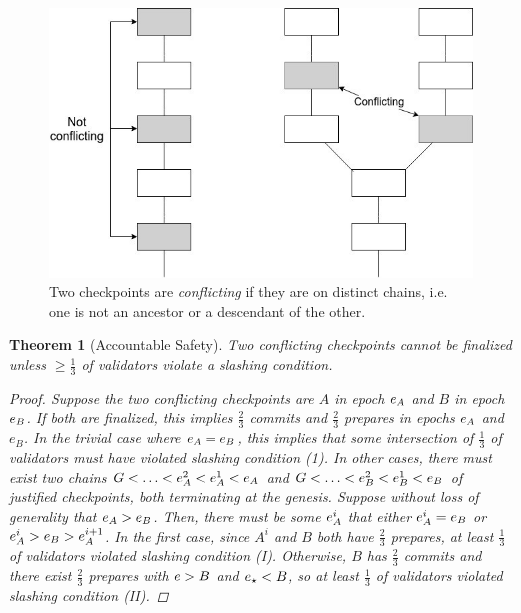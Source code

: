 \documentclass[12pt, final]{article}
\newtheorem{theorem}{Theorem}
\newcommand{\epoch}{\ensuremath{e}\space}
\newcommand{\epochsource}{\ensuremath{\epoch_{\star}}\space}
\newcommand{\Genesisblock}{\ensuremath{G}\space}
\begin{document}
\begin{figure}[h!tb]
\centering
    \includegraphics[width=5in]{conflicting_checkpoints.png}
\caption{Two checkpoints are \textit{conflicting} if they are on distinct chains, i.e. one is not an ancestor or a descendant of the other.}
\label{fig:conflicting_checkpoints}
\end{figure}


\begin{theorem}[Accountable Safety]
\label{theorem:safety}
Two conflicting checkpoints cannot be finalized unless $\geq \frac{1}{3}$ of validators violate a slashing condition.

\begin{proof}
Suppose the two conflicting checkpoints are $A$ in epoch $\epoch_A$ and $B$ in epoch $\epoch_B$. If both are finalized, this implies $\frac{2}{3}$ commits and $\frac{2}{3}$ prepares in epochs $\epoch_A$ and $e_B$. In the trivial case where $\epoch_A = \epoch_B$, this implies that some intersection of $\frac{1}{3}$ of validators must have violated slashing condition (1). In other cases, there must exist two chains $\Genesisblock < \ldots < \epoch_A^2 < \epoch_A^1 < \epoch_A$ and $\Genesisblock < \ldots < \epoch_B^2 < \epoch_B^1 < \epoch_B$ of justified checkpoints, both terminating at the genesis. Suppose without loss of generality that $\epoch_A > \epoch_B$. Then, there must be some $\epoch_A^i$ that either $\epoch_A^i = \epoch_B$ or $\epoch_A^i > \epoch_B > \epoch_A^{i+1}$. In the first case, since $A^i$ and $B$ both have $\frac{2}{3}$ prepares, at least $\frac{1}{3}$ of validators violated slashing condition (I). Otherwise, $B$ has $\frac{2}{3}$ commits and there exist $\frac{2}{3}$ prepares with $\epoch > B$ and $\epochsource < B$, so at least $\frac{1}{3}$ of validators violated slashing condition (II).
\end{proof}
\end{theorem}
\end{document}

